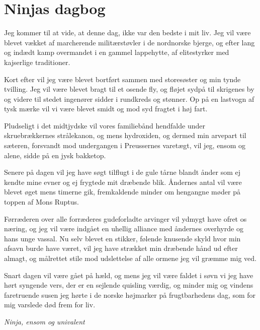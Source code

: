 

\begin{minipage}[b]{0.95\linewidth}
\begin{minipage}[t]{0.47\textwidth}
\vspace{3mm}
\section*{Ninjas dagbog}
Jeg kommer til at vide, at denne dag, ikke var den bedste i mit liv. Jeg vil være blevet vækket af marcherende militærstøvler i de nordnorske bjerge, og efter lang og indædt kamp overmandet i en gammel lappehytte, af elitestyrker med kajserlige traditioner.

Kort efter vil jeg være blevet bortført sammen med storesøster og min tynde tvilling. Jeg vil være blevet bragt til et osende fly, og fløjet sydpå til skrigenes by og videre til stedet ingenører sidder i rundkreds og stønner. Op på en lastvogn af tysk mærke vil vi være blevet smidt og mod syd fragtet i høj fart.

Pludseligt i det midtjydske vil vores familiebånd hendfalde under skruebrækkernes strålekanon, og mens hydroxiden, og dermed min arvepart til sæteren, forsvandt mod undergangen i Preussernes varetægt, vil jeg, ensom og alene, sidde på en jysk bakketop.

Senere på dagen vil jeg have søgt tilflugt i de gule tårne blandt ånder som ej kendte mine evner og ej frygtede mit dræbende blik. Åndernes antal vil være blevet øget mens timerne gik, fremkaldende minder om hengangne møder på toppen af Mons Ruptus.

Førræderen over alle forræderes gudeforladte arvinger vil ydmygt have ofret os næring, og jeg vil være indgået en uhellig alliance med åndernes overhyrde og hans unge vassal. Nu selv blevet en stikker, følende knusende skyld hvor min afsavn burde have været, vil jeg have strækket min dræbende hånd ud efter almagt, og målrettet stile mod udslettelse af alle ormene jeg vil græmme mig ved.

Snart dagen vil være gået på hæld, og mens jeg vil være faldet i søvn vi jeg have hørt syngende vers, der er en sejlende quisling værdig, og minder mig og vindens faretruende susen jeg hørte i de norske højmarker på frugtbarhedens dag, som for mig varslede død frem for liv.

{\flushright\emph{Ninja, ensom og univalent}}

\end{minipage}%
\hfill\begin{minipage}[t]{0.47\textwidth}
\vspace{3mm}

\end{minipage}
\end{minipage}
